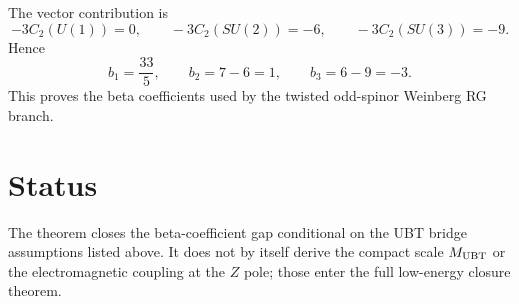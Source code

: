 \documentclass[12pt,a4paper]{article}
\begin{document}
The vector contribution is
\[
  -3C_2(U(1))=0,
  \qquad
  -3C_2(SU(2))=-6,
  \qquad
  -3C_2(SU(3))=-9.
\]
Hence
\[
  b_1=\frac{33}{5},
  \qquad
  b_2=7-6=1,
  \qquad
  b_3=6-9=-3.
\]
This proves the beta coefficients used by the twisted odd-spinor Weinberg RG
branch.

\section{Status}

The theorem closes the beta-coefficient gap conditional on the UBT bridge
assumptions listed above.  It does not by itself derive the compact scale
$M_{\rm UBT}$ or the electromagnetic coupling at the $Z$ pole; those enter the
full low-energy closure theorem.
\end{document}
